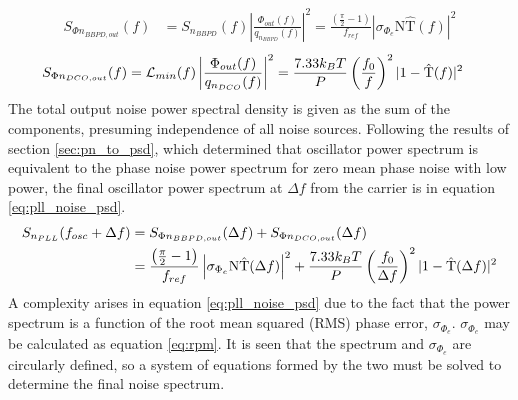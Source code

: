 		\begin{align}\label{eq:out_psd_bbpd_pll}
			S_{\Phi n_{BBPD,out}}(f) &= S_{n_{BBPD}}(f)\left|\frac{\Phi_{out}(f)}{q_{n_{BBPD}}(f)}\right|^2 = \frac{\left(\frac{\pi}{2}-1\right)}{f_{ref}}\left|\sigma_{\Phi_e}\mathrm{N}\hat{\mathrm{T}}(f)\right|^2
		\end{align}
		\begin{align}\label{eq:out_psd_dco_pll}
			S_{\Phi n_{DCO,out}}(f) &= \mathcal{L}_{min}(f)\left|\frac{\Phi_{out}(f)}{q_{n_{DCO}}(f)}\right|^2 = \frac{7.33k_BT}{P}\left(\frac{f_0}{f}\right)^2|1-\hat{\textnormal{T}}(f)|^2 
		\end{align}
		The total output noise power spectral density is given as the sum of the components, presuming independence of all noise sources. Following the results of section \ref{sec:pn_to_psd}, which determined that oscillator power spectrum is equivalent to the phase noise power spectrum for zero mean phase noise with low power, the final oscillator power spectrum at $\Delta f$ from the carrier is in equation \ref{eq:pll_noise_psd}.
		\begin{align}
			S_{n_{PLL}}(f_{osc} + \Delta f) &= S_{\Phi n_{BBPD,out}}(\Delta f) + S_{\Phi n_{DCO,out}}(\Delta f)\label{eq:pll_noise_psd}\\
			&= \frac{\left(\frac{\pi}{2}-1\right)}{f_{ref}}\left|\sigma_{\Phi_e}\mathrm{N}\hat{\mathrm{T}}(\Delta f)\right|^2 + \frac{7.33k_BT}{P}\left(\frac{f_0}{\Delta f}\right)^2|1-\hat{\textnormal{T}}({\Delta f})|^2
		\end{align}
		A complexity arises in equation \ref{eq:pll_noise_psd} due to the fact that the power spectrum is a function of the root mean squared (RMS) phase error, $\sigma_{\Phi_e}$. $\sigma_{\Phi_e}$ may be calculated as equation \ref{eq:rpm}. It is seen that the spectrum and $\sigma_{\Phi_e}$ are circularly defined, so a system of equations formed by the two must be solved to determine the final noise spectrum.


